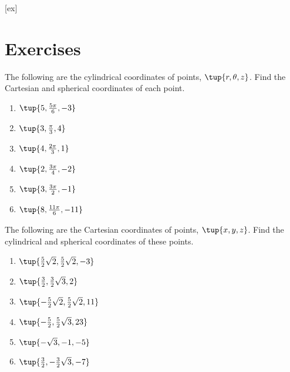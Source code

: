 [ex]
\section*{Exercises}

\begin{enumialphparenastyle}

\begin{ex} The following are the cylindrical coordinates of points, $\tup{
r,\theta,z}$. Find the Cartesian and spherical coordinates of each point.

\begin{enumerate}
\item $\tup{5,\frac{5\pi }{6},-3} $

\item $\tup{3,\frac{\pi }{3},4} $

\item $\tup{4,\frac{2\pi }{3},1} $

\item $\tup{2,\frac{3\pi }{4},-2} $

\item $\tup{3,\frac{3\pi }{2},-1} $

\item $\tup{8,\frac{11\pi }{6},-11} $
\end{enumerate}
\end{ex}

\begin{ex} The following are the Cartesian coordinates of points, $\tup{
x,y,z}$. Find the cylindrical and spherical coordinates of these
points.

\begin{enumerate}
\item $\tup{\frac{5}{2}\sqrt{2},\frac{5}{2}\sqrt{2},-3} $

\item $\tup{\frac{3}{2},\frac{3}{2}\sqrt{3},2} $

\item $\tup{-\frac{5}{2}\sqrt{2},\frac{5}{2}\sqrt{2},11} $

\item $\tup{-\frac{5}{2},\frac{5}{2}\sqrt{3},23} $

\item $\tup{-\sqrt{3},-1,-5} $

\item $\tup{\frac{3}{2},-\frac{3}{2}\sqrt{3},-7} $


\end{enumerate}
\end{ex}
\end{enumialphparenastyle}
